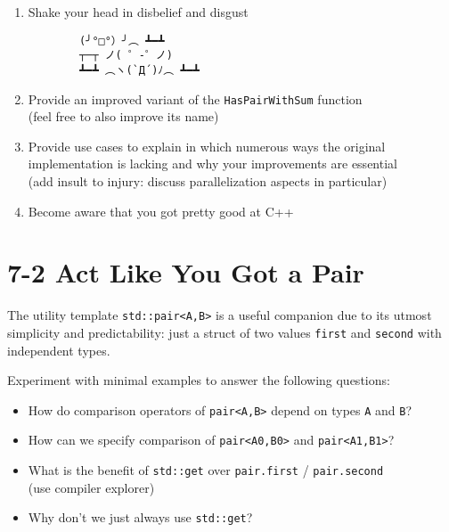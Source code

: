 \documentclass[]{article}
\providecommand{\tightlist}{%
  \setlength{\itemsep}{0pt}\setlength{\parskip}{0pt}}
\begin{document}
\begin{enumerate}
\def\labelenumi{\arabic{enumi}.}
\tightlist
\item
  Shake your head in disbelief and disgust
        \begin{lstlisting}
        (╯°□°）╯︵ ┻━┻
        ┬─┬﻿ ノ( ゜-゜ノ)
        ┻━┻ ︵ヽ(`Д´)ﾉ︵﻿ ┻━┻
        \end{lstlisting}
\item
  Provide an improved variant of the \texttt{HasPairWithSum} function\\
   (feel free to also improve its name)
\item
  Provide use cases to explain in which numerous ways the original
  implementation is lacking and why your improvements are essential\\
   (add insult to injury: discuss parallelization aspects in particular)

\item
  Become aware that you got pretty good at C++
\end{enumerate}

\section{7-2 Act Like You Got a Pair}\label{act-like-you-got-a-pair}

The utility template \texttt{std::pair\textless{}A,B\textgreater{}} is a
useful companion due to its utmost simplicity and predictability: just a
struct of two values \texttt{first} and \texttt{second} with independent
types.

Experiment with minimal examples to answer the following questions:

\begin{itemize}
\tightlist
\item
  How do comparison operators of
  \texttt{pair\textless{}A,B\textgreater{}} depend on types \texttt{A}
  and \texttt{B}?
\item
  How can we specify comparison of
  \texttt{pair\textless{}A0,B0\textgreater{}} and
  \texttt{pair\textless{}A1,B1\textgreater{}}?
\item
  What is the benefit of \texttt{std::get} over \texttt{pair.first} /
  \texttt{pair.second}\\
   (use compiler explorer)
\item
  Why don't we just always use \texttt{std::get}?
\end{itemize}
\end{document}
